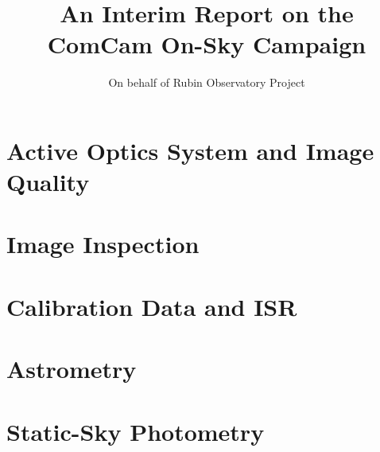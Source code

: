 \documentclass[SE,lsstdraft,authoryear,toc]{lsstdoc}
\title{An Interim Report on the ComCam On-Sky Campaign}
\author{%
On behalf of Rubin Observatory Project
}
\date{\vcsDate}
\begin{document}
\maketitle










\section{Active Optics System and Image Quality}








\section{Image Inspection}
\label{sec:image_inspection}



\section{Calibration Data and ISR}




\section{Astrometry}



\section{Static-Sky Photometry}






\end{document}
